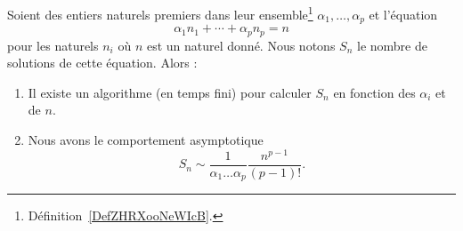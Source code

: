 \begin{theorem} \label{ThoDIDNooUrFFei}
    Soient des entiers naturels premiers dans leur ensemble\footnote{Définition~\ref{DefZHRXooNeWIcB}.} \( \alpha_1,\ldots, \alpha_p\) et l'équation
    \begin{equation}
        \alpha_1n_1+\cdots +\alpha_pn_p=n
    \end{equation}
    pour les naturels \( n_i\) où \( n\) est un naturel donné. Nous notons \( S_n\) le nombre de solutions de cette équation. Alors :
    \begin{enumerate}
        \item
            Il existe un algorithme (en temps fini) pour calculer \( S_n\) en fonction des \( \alpha_i\) et de \( n\).
        \item
            Nous avons le comportement asymptotique
            \begin{equation}
                S_n\sim\frac{1}{ \alpha_1\ldots\alpha_p }\frac{ n^{p-1} }{ (p-1)! }.
            \end{equation}
    \end{enumerate}
\end{theorem}

